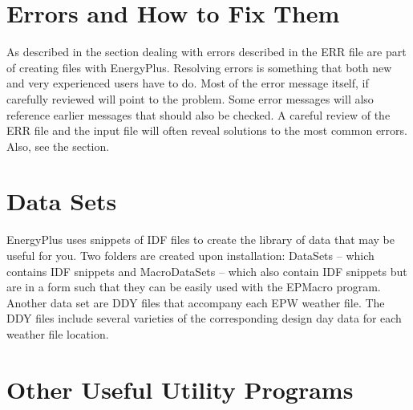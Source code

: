 \section{Errors and How to Fix Them}

As described in the  section
dealing with errors described in the ERR file are part of creating
files with EnergyPlus. Resolving errors is something that both new
and very experienced users have to do. Most of the error message itself,
if carefully reviewed will point to the problem. Some error messages
will also reference earlier messages that should also be checked.
A careful review of the ERR file and the input file will often reveal
solutions to the most common errors. Also, see the 
section.

\section{Data Sets}

EnergyPlus uses snippets of IDF files to create the library of data
that may be useful for you. Two folders are created upon installation:
DataSets -- which contains IDF snippets and MacroDataSets -- which
also contain IDF snippets but are in a form such that they can be
easily used with the EPMacro program. Another data set are DDY files
that accompany each EPW weather file. The DDY files include several
varieties of the corresponding design day data for each weather file
location.

\section{Other Useful Utility Programs}

